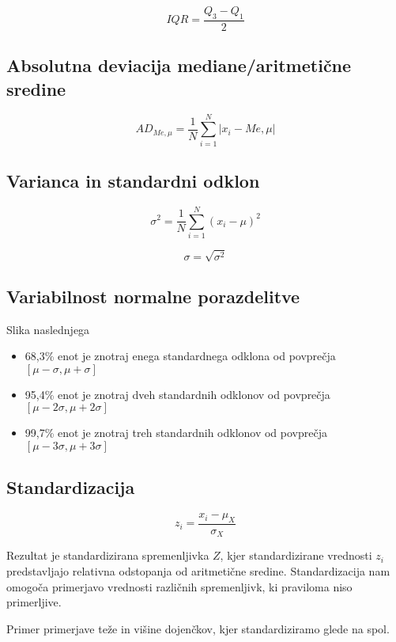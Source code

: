 \[IQR =\frac{Q_3 -Q_1}{2}\]

\subsection*{Absolutna deviacija mediane/aritmetične sredine}

\[AD_{Me,\mu}=\frac{1}{N}\sum_{i=1}^{N}|x_i - Me,\mu|\]

\subsection*{Varianca in standardni odklon}

\[\sigma^2 = \frac{1}{N} \sum_{i=1}^{N} (x_i - \mu)^2\]

\[\sigma = \sqrt{\sigma^2}\]

\subsection*{Variabilnost normalne porazdelitve}

Slika naslednjega

\begin{itemize}
    \item 68,3\% enot je znotraj enega standardnega odklona od povprečja \([\mu - \sigma, \mu + \sigma]\)
    \item 95,4\% enot je znotraj dveh standardnih odklonov od povprečja \([\mu - 2\sigma, \mu + 2\sigma]\)
    \item 99,7\% enot je znotraj treh standardnih odklonov od povprečja \([\mu - 3\sigma, \mu + 3\sigma]\)
\end{itemize}

\subsection*{Standardizacija}

\[z_i = \frac{x_i - \mu_X}{\sigma_X}\]

Rezultat je standardizirana spremenljivka $Z$, kjer standardizirane vrednosti $z_i$ predstavljajo relativna odstopanja od aritmetične sredine. Standardizacija nam omogoča primerjavo vrednosti različnih spremenljivk, ki praviloma niso primerljive.

Primer primerjave teže in višine dojenčkov, kjer standardiziramo glede na spol.

